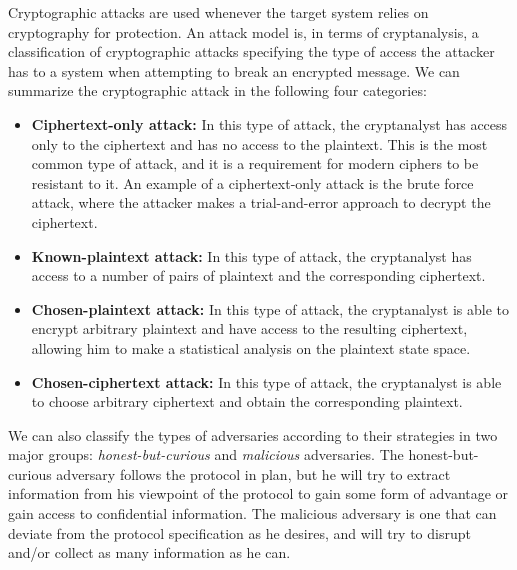 Cryptographic attacks are used whenever the target system relies on cryptography for protection. An attack model is, in terms of cryptanalysis, a classification of cryptographic attacks specifying the type of access the attacker has to a system when attempting to break an encrypted message. We can summarize the cryptographic attack in the following four categories:

 \begin{itemize}
    \setlength\itemsep{1em}

    \item \textbf{Ciphertext-only attack:} In this type of attack, the cryptanalyst has access only to the ciphertext and has no access to the plaintext. This is the most common type of attack, and it is a requirement for modern ciphers to be resistant to it. An example of a ciphertext-only attack is the brute force attack, where the attacker makes a trial-and-error approach to decrypt the ciphertext.

    \item \textbf{Known-plaintext attack:} In this type of attack, the cryptanalyst has access to a number of pairs of plaintext and the corresponding ciphertext.

    \item \textbf{Chosen-plaintext attack:} In this type of attack, the cryptanalyst is able to encrypt arbitrary plaintext and have access to the resulting ciphertext, allowing him to make a statistical analysis on the plaintext state space.

    \item \textbf{Chosen-ciphertext attack:} In this type of attack, the cryptanalyst is able to choose arbitrary ciphertext and obtain the corresponding plaintext.
\end{itemize}


We can also classify the types of adversaries according to their strategies in two major groups: \textit{honest-but-curious} and \textit{malicious} adversaries.
The honest-but-curious adversary follows the protocol in plan, but he will try to extract information from his viewpoint of the protocol to gain some form of advantage or gain access to confidential information.
The malicious adversary is one that can deviate from the protocol specification as he desires, and will try to disrupt and/or collect as many information as he can.

%

